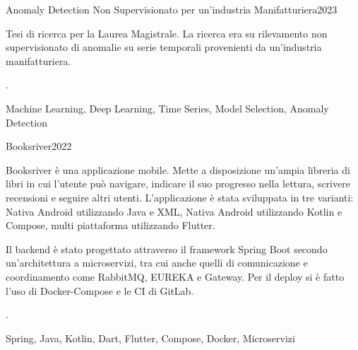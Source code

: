 
\begin{projects}


 
	\project
	{Anomaly Detection Non Supervisionato per un'industria Manifatturiera}{2023}
	{Tesi di ricerca per la Laurea Magistrale. La ricerca era su rilevamento non supervisionato di anomalie su serie temporali provenienti da un'industria manifatturiera.
		 
		. }
	{Machine Learning, Deep Learning, Time Series, Model Selection, Anomaly Detection}
	
	\project
	{Booksriver}{2022}
	{Booksriver è una applicazione mobile. Mette a disposizione un’ampia libreria di libri in cui l’utente può navigare, indicare il suo progresso nella lettura, scrivere recensioni e seguire altri utenti. L'applicazione è stata sviluppata in tre varianti: Nativa Android utilizzando Java e XML, Nativa Android utilizzando Kotlin e Compose, multi piattaforma utilizzando Flutter. 
		 
		Il backend è stato progettato attraverso il framework Spring Boot secondo un'architettura a microservizi, tra cui anche quelli di comunicazione e coordinamento come RabbitMQ, EUREKA e Gateway. Per il deploy si è fatto l'uso di Docker-Compose e le CI di GitLab. 
		 
		. }
	{Spring, Java, Kotlin, Dart, Flutter, Compose, Docker, Microservizi}

	
	 
	
\end{projects}